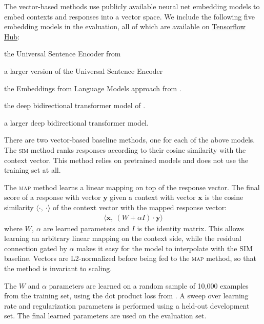 \documentclass[11pt,a4paper,table]{article}
\begin{document}
The vector-based methods use publicly available neural net embedding models to embed contexts and responses into a vector space. We include the following five embedding models in the evaluation, all of which are available on \href{https://www.tensorflow.org/hub}{Tensorflow Hub}:

\begin{description}[itemindent=1mm]
  \setlength\itemsep{0.1em}
    \item[\textsc{use}] the Universal Sentence Encoder from 
    \item[\textsc{use-large}] a larger version of the Universal Sentence Encoder
    \item[\textsc{elmo}]  the Embeddings from Language Models approach from .
    \item[\textsc{bert-small}] the deep bidirectional transformer model of .
    \item[\textsc{bert-large}] a larger deep bidirectional transformer model.
\end{description}

There are two vector-based baseline methods, one for each of the above models. The \textsc{sim} method ranks responses according to their cosine similarity with the context vector. This method relies on pretrained models and does not use the training set at all.

The \textsc{map} method learns a linear mapping on top of the response vector. The final score of a response with vector $\mathbf{y}$ given a context with vector $\mathbf{x}$ is the cosine similarity $\langle \cdot,\: \cdot\rangle$ of the context vector with the mapped response vector:
\begin{align}
\langle \mathbf{x},\: \left( W + \alpha I \right) \cdot\mathbf{y} \rangle
\end{align}
where $W, \: \alpha$ are learned parameters and $I$ is the identity matrix. This allows learning an arbitrary linear mapping on the context side, while the residual connection gated by $\alpha$ makes it easy for the model to interpolate with the \textsc{SIM} baseline. Vectors are L2-normalized before being fed to the \textsc{map} method, so that the method is invariant to scaling.

The $W$ and $\alpha$ parameters are learned on a random sample of 10,000 examples from the training set, using the dot product loss from . A sweep over learning rate and regularization parameters is performed using a held-out development set. The final learned parameters are used on the evaluation set.
\end{document}
